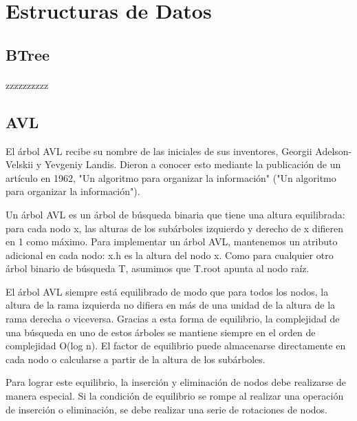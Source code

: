 \documentclass{article}
\begin{document}
	\section{Estructuras de Datos}
        \subsection{BTree}
            \paragraph{}
   zzzzzzzzzz


        \subsection{AVL}

        El árbol AVL recibe su nombre de las iniciales  de sus inventores, Georgii Adelson-Velskii y Yevgeniy Landis. Dieron a conocer esto mediante la publicación de un artículo en 1962, "Un algoritmo para organizar la información" ("Un algoritmo para organizar la información").
        
        Un árbol AVL es un árbol de búsqueda binaria que tiene una altura equilibrada: para cada nodo x, las alturas de los subárboles izquierdo y derecho de x difieren en 1 como máximo. Para implementar un árbol AVL, mantenemos un atributo adicional en cada nodo: x.h es la altura del nodo x. Como para cualquier otro árbol binario de búsqueda T, asumimos que T.root apunta al nodo raíz.
        
        El árbol AVL siempre está equilibrado de  modo que para todos los nodos, la altura de la rama izquierda no difiera en más de una unidad de la altura de la rama derecha o viceversa. Gracias a esta forma de equilibrio, la complejidad de una búsqueda en uno de estos árboles se mantiene siempre en el orden de complejidad O(log n). El factor de equilibrio puede almacenarse directamente en cada nodo o calcularse a partir de la altura de los subárboles.
        
        Para lograr este equilibrio, la inserción y eliminación de  nodos debe realizarse de manera especial. Si la condición de equilibrio se rompe al realizar una operación de inserción o eliminación, se debe realizar una serie de rotaciones de  nodos.
         
\end{document}

